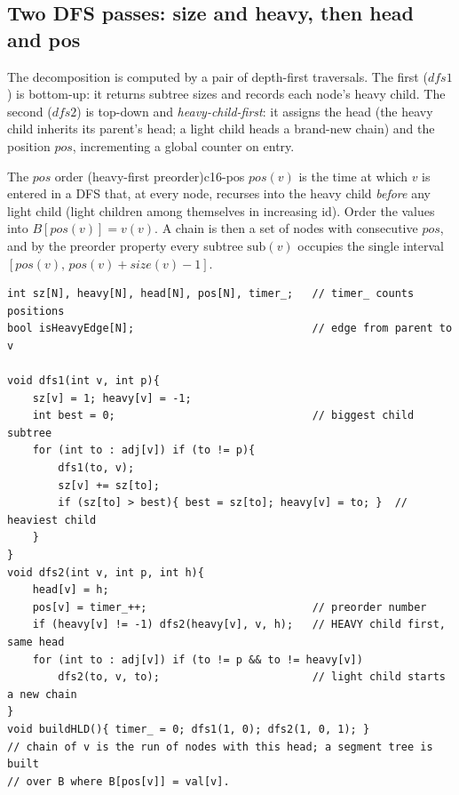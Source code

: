 \subsection{Two DFS passes: size and heavy, then head and pos}

The decomposition is computed by a pair of depth-first traversals.  The first (\(\mathit{dfs1}\)) is bottom-up: it returns subtree sizes and records each node's heavy child.  The second (\(\mathit{dfs2}\)) is top-down and \emph{heavy-child-first}: it assigns the head (the heavy child inherits its parent's head; a light child heads a brand-new chain) and the position \(\mathit{pos}\), incrementing a global counter on entry.

\begin{definition}{The \(\mathit{pos}\) order (heavy-first preorder)}{c16-pos}
\(\mathit{pos}(v)\) is the time at which \(v\) is entered in a DFS that, at every node, recurses into the heavy child \emph{before} any light child (light children among themselves in increasing id).  Order the values into \(B[\mathit{pos}(v)] = v(v)\).  A chain is then a set of nodes with consecutive \(\mathit{pos}\), and by the preorder property every subtree \(\mathrm{sub}(v)\) occupies the single interval \([\mathit{pos}(v),\,\mathit{pos}(v)+\mathit{size}(v)-1]\).
\end{definition}

\begin{lstlisting}[caption={Heavy-light build: dfs1 fills size and the heavy child, dfs2 fills head and the heavy-first pos. ASCII only; adj = adjacency, v() = node values}, label={lst:c16-build}]
int sz[N], heavy[N], head[N], pos[N], timer_;   // timer_ counts positions
bool isHeavyEdge[N];                            // edge from parent to v

void dfs1(int v, int p){
    sz[v] = 1; heavy[v] = -1;
    int best = 0;                               // biggest child subtree
    for (int to : adj[v]) if (to != p){
        dfs1(to, v);
        sz[v] += sz[to];
        if (sz[to] > best){ best = sz[to]; heavy[v] = to; }  // heaviest child
    }
}
void dfs2(int v, int p, int h){
    head[v] = h;
    pos[v] = timer_++;                          // preorder number
    if (heavy[v] != -1) dfs2(heavy[v], v, h);   // HEAVY child first, same head
    for (int to : adj[v]) if (to != p && to != heavy[v])
        dfs2(to, v, to);                        // light child starts a new chain
}
void buildHLD(){ timer_ = 0; dfs1(1, 0); dfs2(1, 0, 1); }
// chain of v is the run of nodes with this head; a segment tree is built
// over B where B[pos[v]] = val[v].
\end{lstlisting}

